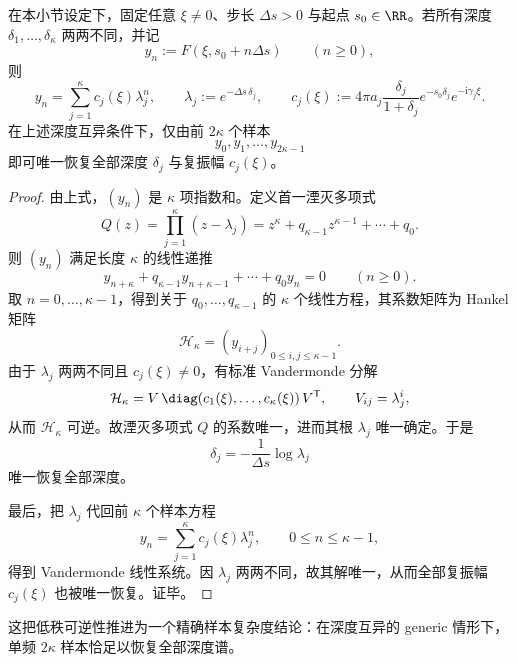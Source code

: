 \begin{theorem}\label{thm:cdim-atomic-defect-prony-2kappa-recovery}
在本小节设定下，固定任意 \(\xi\neq 0\)、步长 \(\Delta s>0\) 与起点 \(s_0\in\RR\)。若所有深度 \(\delta_1,\dots,\delta_\kappa\) 两两不同，并记
\[
y_n:=F(\xi,s_0+n\Delta s)\qquad(n\ge 0),
\]
则
\[
y_n=\sum_{j=1}^{\kappa} c_j(\xi)\lambda_j^n,
\qquad
\lambda_j:=e^{-\Delta s\,\delta_j},
\qquad
c_j(\xi):=4\pi a_j\frac{\delta_j}{1+\delta_j}e^{-s_0\delta_j}e^{-\mathrm{i}\gamma_j\xi}.
\]
在上述深度互异条件下，仅由前 \(2\kappa\) 个样本
\[
y_0,y_1,\dots,y_{2\kappa-1}
\]
即可唯一恢复全部深度 \(\delta_j\) 与复振幅 \(c_j(\xi)\)。
\end{theorem}
\begin{proof}
由上式，\((y_n)\) 是 \(\kappa\) 项指数和。定义首一湮灭多项式
\[
Q(z)=\prod_{j=1}^{\kappa}(z-\lambda_j)
=
z^\kappa+q_{\kappa-1}z^{\kappa-1}+\cdots+q_0.
\]
则 \((y_n)\) 满足长度 \(\kappa\) 的线性递推
\[
y_{n+\kappa}+q_{\kappa-1}y_{n+\kappa-1}+\cdots+q_0y_n=0
\qquad(n\ge 0).
\]
取 \(n=0,\dots,\kappa-1\)，得到关于 \(q_0,\dots,q_{\kappa-1}\) 的 \(\kappa\) 个线性方程，其系数矩阵为 Hankel 矩阵
\[
\mathcal H_\kappa=(y_{i+j})_{0\le i,j\le \kappa-1}.
\]
由于 \(\lambda_j\) 两两不同且 \(c_j(\xi)\neq 0\)，有标准 Vandermonde 分解
\[
\mathcal H_\kappa=
V\,\diag(c_1(\xi),\dots,c_\kappa(\xi))\,V^{\mathsf T},
\qquad
V_{ij}=\lambda_j^i,
\]
从而 \(\mathcal H_\kappa\) 可逆。故湮灭多项式 \(Q\) 的系数唯一，进而其根 \(\lambda_j\) 唯一确定。于是
\[
\delta_j=-\frac{1}{\Delta s}\log \lambda_j
\]
唯一恢复全部深度。
\par
最后，把 \(\lambda_j\) 代回前 \(\kappa\) 个样本方程
\[
y_n=\sum_{j=1}^{\kappa} c_j(\xi)\lambda_j^n,
\qquad
0\le n\le \kappa-1,
\]
得到 Vandermonde 线性系统。因 \(\lambda_j\) 两两不同，故其解唯一，从而全部复振幅 \(c_j(\xi)\) 也被唯一恢复。证毕。
\end{proof}
这把低秩可逆性推进为一个精确样本复杂度结论：在深度互异的 generic 情形下，单频 \(2\kappa\) 样本恰足以恢复全部深度谱。

